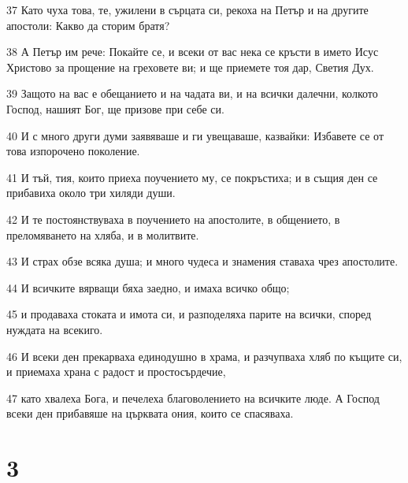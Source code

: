 \par 37 Като чуха това, те, ужилени в сърцата си, рекоха на Петър и на другите апостоли: Какво да сторим братя?
\par 38 А Петър им рече: Покайте се, и всеки от вас нека се кръсти в името Исус Христово за прощение на греховете ви; и ще приемете тоя дар, Светия Дух.
\par 39 Защото на вас е обещанието и на чадата ви, и на всички далечни, колкото Господ, нашият Бог, ще призове при себе си.
\par 40 И с много други думи заявяваше и ги увещаваше, казвайки: Избавете се от това изпорочено поколение.
\par 41 И тъй, тия, които приеха поучението му, се покръстиха; и в същия ден се прибавиха около три хиляди души.
\par 42 И те постоянствуваха в поучението на апостолите, в общението, в преломяването на хляба, и в молитвите.
\par 43 И страх обзе всяка душа; и много чудеса и знамения ставаха чрез апостолите.
\par 44 И всичките вярващи бяха заедно, и имаха всичко общо;
\par 45 и продаваха стоката и имота си, и разподеляха парите на всички, според нуждата на всекиго.
\par 46 И всеки ден прекарваха единодушно в храма, и разчупваха хляб по къщите си, и приемаха храна с радост и простосърдечие,
\par 47 като хвалеха Бога, и печелеха благоволението на всичките люде. А Господ всеки ден прибавяше на църквата ония, които се спасяваха.

\chapter{3}

